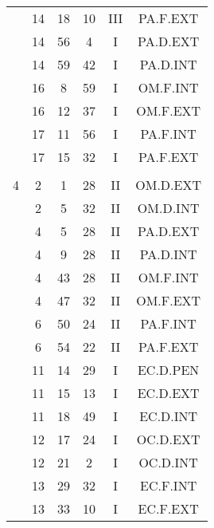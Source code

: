 \documentclass[12pt, a4paper]{article}
\begin{document}
\begin{multicols}{3}
{\begin{tabular}{c c c c c c}
	 	 	 	 & 14 & 18 & 10 & III & PA.F.EXT\\%
	 	 	 	 & 14 & 56 & 4 & I & PA.D.EXT\\%
	 	 	 	 & 14 & 59 & 42 & I & PA.D.INT\\%
	 	 	 	 & 16 & 8 & 59 & I & OM.F.INT\\%
	 	 	 	 & 16 & 12 & 37 & I & OM.F.EXT\\%
	 	 	 	 & 17 & 11 & 56 & I & PA.F.INT\\%
	 	 	 	 & 17 & 15 & 32 & I & PA.F.EXT\\%
	 	 	 	 & & & & & \\%
	 	 	 	4 & 2 & 1 & 28 & II & OM.D.EXT\\%
	 	 	 	 & 2 & 5 & 32 & II & OM.D.INT\\%
	 	 	 	 & 4 & 5 & 28 & II & PA.D.EXT\\%
	 	 	 	 & 4 & 9 & 28 & II & PA.D.INT\\%
	 	 	 	 & 4 & 43 & 28 & II & OM.F.INT\\%
	 	 	 	 & 4 & 47 & 32 & II & OM.F.EXT\\%
	 	 	 	 & 6 & 50 & 24 & II & PA.F.INT\\%
	 	 	 	 & 6 & 54 & 22 & II & PA.F.EXT\\%
	 	 	 	 & 11 & 14 & 29 & I & EC.D.PEN\\%
	 	 	 	 & 11 & 15 & 13 & I & EC.D.EXT\\%
	 	 	 	 & 11 & 18 & 49 & I & EC.D.INT\\%
	 	 	 	 & 12 & 17 & 24 & I & OC.D.EXT\\%
	 	 	 	 & 12 & 21 & 2 & I & OC.D.INT\\%
	 	 	 	 & 13 & 29 & 32 & I & EC.F.INT\\%
	 	 	 	 & 13 & 33 & 10 & I & EC.F.EXT\\%

\end{tabular}}
\end{multicols}
\end{document}
